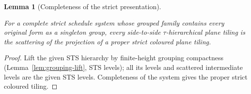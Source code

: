 \documentclass[11pt,a4paper]{article}
\newtheorem{lemma}[definition]{Lemma}
\theoremstyle{remark}
\newcommand{\lean}[1]{}
\newcommand{\uses}[1]{}
\begin{document}
\begin{lemma}[Completeness of the strict presentation]\label{lem:strict-complete}
\lean{Tilings.Alignment.exists_strict_proper_of_sts_hierarchical}
\uses{lem:strict-presentation,lem:grouping-lift,def:hierarchy}
For a complete strict schedule system whose grouped family contains every
original form as a singleton group, every side-to-side $\tau$-hierarchical
plane tiling is the scattering of the projection of a proper strict coloured
plane tiling.
\end{lemma}
\begin{proof}
Lift the given STS hierarchy by finite-height grouping compactness
(Lemma~\ref{lem:grouping-lift}, STS levels); all its levels and scattered
intermediate levels are the given STS levels. Completeness of the system
gives the proper strict coloured tiling.
\end{proof}
\end{document}
